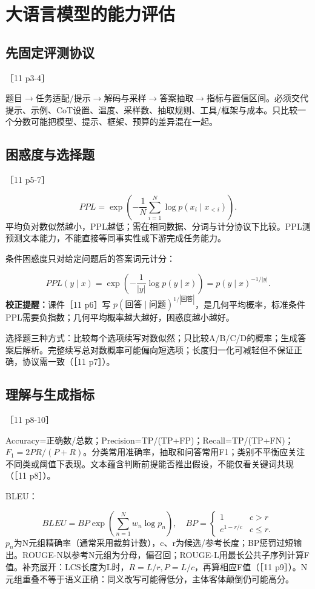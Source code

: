 \documentclass[UTF8,a4paper,zihao=-4,fontset=windows]{ctexart}
\newcommand{\source}[1]{{\small #1}\par}
\begin{document}
\section{大语言模型的能力评估}
\subsection{先固定评测协议}
\source{［11 p3-4］}
题目\ensuremath{\rightarrow}任务适配/\allowbreak{}提示\ensuremath{\rightarrow}解码与采样\ensuremath{\rightarrow}答案抽取\ensuremath{\rightarrow}指标与置信区间。必须交代提示、示例、CoT设置、温度、采样数、抽取规则、工具/\allowbreak{}框架与成本。只比较一个分数可能把模型、提示、框架、预算的差异混在一起。

\subsection{困惑度与选择题}
\source{［11 p5-7］}
\[PPL=\exp\left(-\frac1N\sum_{i=1}^N\log p(x_i\mid x_{<i})\right).\]
平均负对数似然越小，PPL越低；需在相同数据、分词与计分协议下比较。PPL测预测文本能力，不能直接等同事实性或下游完成任务能力。

条件困惑度只对给定问题后的答案词元计分：

\[PPL(y\mid x)=\exp\left(-\frac1{|y|}\log p(y\mid x)\right)=p(y\mid x)^{-1/|y|}.\]
\textbf{校正提醒：}课件［11 p6］写 $p(\text{回答}\mid\text{问题})^{1/|\text{回答}|}$，是几何平均概率，标准条件PPL需要负指数；几何平均概率越大越好，困惑度越小越好。

选择题三种方式：比较每个选项续写对数似然；只比较A/\allowbreak{}B/\allowbreak{}C/\allowbreak{}D的概率；生成答案后解析。完整续写总对数概率可能偏向短选项；长度归一化可减轻但不保证正确，协议需一致（［11 p7］）。

\subsection{理解与生成指标}
\source{［11 p8-10］}
Accuracy=正确数/\allowbreak{}总数；Precision=TP/\allowbreak{}(TP+FP)；Recall=TP/\allowbreak{}(TP+FN)；$F_1=2PR/(P+R)$。分类常用准确率，抽取和问答常用F1；类别不平衡应关注不同类或阈值下表现。文本蕴含判断前提能否推出假设，不能仅看关键词共现（［11 p8］）。

BLEU：

\[BLEU=BP\exp\left(\sum_{n=1}^{N}w_n\log p_n\right),\quad BP=\begin{cases}1&c>r\\e^{1-r/c}&c\le r.\end{cases}\]
$p_n$为N元组精确率（通常采用裁剪计数），c、r为候选/\allowbreak{}参考长度；BP惩罚过短输出。ROUGE-N以参考N元组为分母，偏召回；ROUGE-L用最长公共子序列计算F值。补充展开：LCS长度为L时，$R=L/r,P=L/c$，再算相应F值（［11 p9］）。N元组重叠不等于语义正确：同义改写可能得低分，主体客体颠倒仍可能高分。
\end{document}

